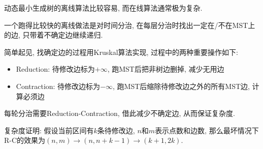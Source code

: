 动态最小生成树的离线算法比较容易, 而在线算法通常极为复杂.

一个跑得比较快的离线做法是对时间分治, 在每层分治时找出一定在/不在MST上的边, 只带着不确定边继续递归.

简单起见, 找确定边的过程用Kruskal算法实现, 过程中的两种重要操作如下:

\begin{itemize}
	\item Reduction: 待修改边标为$+\infty$, 跑MST后把非树边删掉, 减少无用边
	\item Contraction: 待修改边标为$-\infty$, 跑MST后缩除待修改边之外的所有MST边, 计算必须边
\end{itemize}

每轮分治需要Reduction-Contraction, 借此减少不确定边, 从而保证复杂度.

复杂度证明: 假设当前区间有$k$条待修改边, $n$和$m$表示点数和边数, 那么最坏情况下R-C的效果为$(n, m) \to (n, n + k - 1) \to (k + 1, 2k)$.

\inputminted{cpp}{../src/graph/动态最小生成树.cpp}